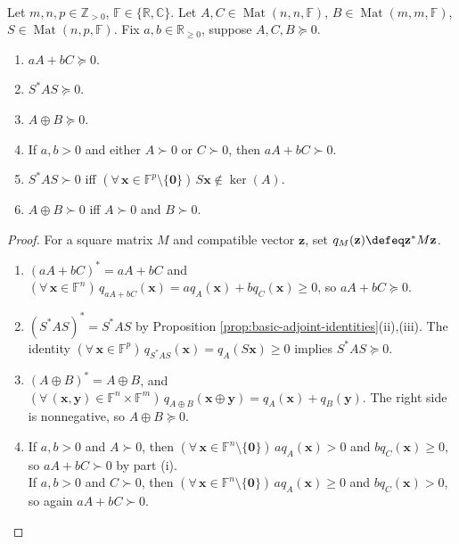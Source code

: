 \begin{theorem} \label{thm:positive-semidefinite-stability-rules} \\
Let $m,n,p\in\mathbb{Z}_{>0}$, $\mathbb{F}\in\{\mathbb{R},\mathbb{C}\}$. Let $A,C\in\operatorname{Mat}(n,n,\mathbb{F})$, $B\in\operatorname{Mat}(m,m,\mathbb{F})$,  $S\in\operatorname{Mat}(n,p,\mathbb{F})$. Fix $a,b\in\mathbb{R}_{\geq0}$, suppose $A,C,B\succeq0$.
\begin{enumerate}[label=(\roman*)]
\setlength{\itemsep}{0pt}
\item $aA+bC\succeq0$.
\item $S^*AS\succeq0$.
\item $A\oplus B\succeq0$.
\item If $a,b>0$ and either $A\succ0$ or $C\succ0$, then $aA+bC\succ0$.
\item $S^*AS\succ0$ iff $(\forall\,\mathbf{x}\in\mathbb{F}^p\setminus\{\mathbf{0}\})\,S\mathbf{x}\notin\ker(A)$.
\item $A\oplus B\succ0$ iff $A\succ0$ and $B\succ0$.
\end{enumerate}
\begin{proof}
For a square matrix $M$ and compatible vector $\mathbf{z}$, set $q_M(\mathbf{z})\defeq\mathbf{z}^*M\mathbf{z}$.
\begin{enumerate}[label=(\roman*)]
\setlength{\itemsep}{0pt}
\item[$(i)$] $(aA+bC)^*=aA+bC$ and $(\forall\,\mathbf{x}\in\mathbb{F}^n)\,q_{aA+bC}(\mathbf{x})=aq_A(\mathbf{x})+bq_C(\mathbf{x})\geq0$, so $aA+bC\succeq0$.
\item[$(ii)$] $(S^*AS)^*=S^*AS$ by Proposition \ref{prop:basic-adjoint-identities}(ii),(iii). The identity $(\forall\,\mathbf{x}\in\mathbb{F}^p)\,q_{S^*AS}(\mathbf{x})=q_A(S\mathbf{x})\geq0$ implies $S^*AS\succeq0$.
\item[$(iii)$] $(A\oplus B)^*=A\oplus B$, and $(\forall\,(\mathbf{x},\mathbf{y})\in\mathbb{F}^n\times\mathbb{F}^m)\,q_{A\oplus B}(\mathbf{x}\oplus\mathbf{y})=q_A(\mathbf{x})+q_B(\mathbf{y})$. The right side is nonnegative, so $A\oplus B\succeq0$.
\item[$(iv)$] If $a,b>0$ and $A\succ0$, then $(\forall\,\mathbf{x}\in\mathbb{F}^n\setminus\{\mathbf{0}\})\,aq_A(\mathbf{x})>0$ and $bq_C(\mathbf{x})\geq0$, so $aA+bC\succ0$ by part (i).\\
If $a,b>0$ and $C\succ0$, then $(\forall\,\mathbf{x}\in\mathbb{F}^n\setminus\{\mathbf{0}\})\,aq_A(\mathbf{x})\geq0$ and $bq_C(\mathbf{x})>0$, so again $aA+bC\succ0$.

\end{enumerate}
\end{proof}
\end{theorem}
